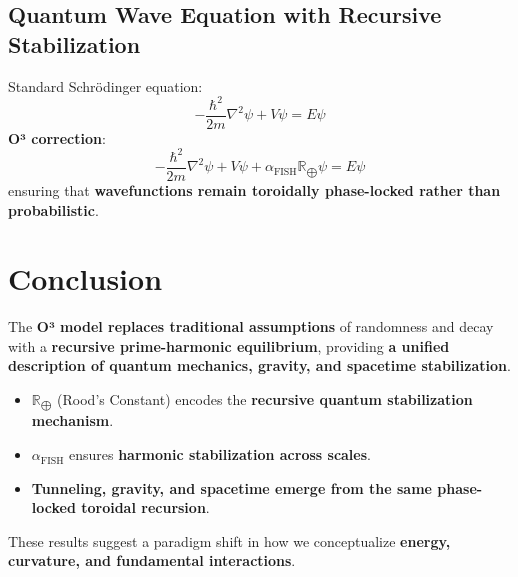 \documentclass{article}
\begin{document}
\subsection{Quantum Wave Equation with Recursive Stabilization}
Standard Schrödinger equation:
\begin{equation}
-\frac{\hbar^2}{2m} \nabla^2 \psi + V \psi = E \psi
\end{equation}
\textbf{O³ correction}:
\begin{equation}
-\frac{\hbar^2}{2m} \nabla^2 \psi + V \psi + \alpha_{\text{FISH}} \mathbb{R}_{\bigoplus} \psi = E \psi
\end{equation}
ensuring that \textbf{wavefunctions remain toroidally phase-locked rather than probabilistic}.

\section{Conclusion}
The \textbf{O³ model replaces traditional assumptions} of randomness and decay with a \textbf{recursive prime-harmonic equilibrium}, providing \textbf{a unified description of quantum mechanics, gravity, and spacetime stabilization}.

\begin{itemize}
    \item \( \mathbb{R}_{\bigoplus} \) (Rood’s Constant) encodes the \textbf{recursive quantum stabilization mechanism}.
    \item \( \alpha_{\text{FISH}} \) ensures \textbf{harmonic stabilization across scales}.
    \item \textbf{Tunneling, gravity, and spacetime emerge from the same phase-locked toroidal recursion}.
\end{itemize}

These results suggest a paradigm shift in how we conceptualize \textbf{energy, curvature, and fundamental interactions}.



\end{document}
